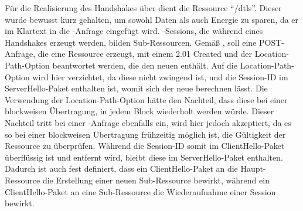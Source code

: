 Für die Realisierung des Handshakes über  dient die Ressource "`/dtls"'. Dieser  wurde bewusst kurz gehalten, um sowohl Daten
als auch Energie zu sparen, da er im Klartext in die -Anfrage eingefügt wird. -Sessions, die während eines Handshakes erzeugt
werden, bilden Sub-Ressourcen. Gemäß  \cite[Abschnitt 5.8.2]{draftcoap13}, soll eine POST-Anfrage, die eine Ressource erzeugt, mit einem
2.01 Created und der Location-Path-Option beantwortet werden, die den neuen  enthält. Auf die Location-Path-Option wird hier verzichtet,
da diese nicht zwingend ist, und die Session-ID im ServerHello-Paket enthalten ist, womit sich der neue  berechnen lässt. Die Verwendung
der Location-Path-Option hätte den Nachteil, dass diese bei einer blockweisen Übertragung, in jedem Block wiederholt werden würde. Dieser Nachteil
tritt bei einer -Anfrage ebenfalls ein, wird hier jedoch akzeptiert, da es so bei einer blockweisen Übertragung frühzeitig möglich ist,
die Gültigkeit der Ressource zu überprüfen. Während die Session-ID somit im ClientHello-Paket überflüssig ist und entfernt wird, bleibt diese im
ServerHello-Paket enthalten. Dadurch ist auch fest definiert, dass ein ClientHello-Paket an die Haupt-Ressource die Erstellung einer neuen
Sub-Ressource bewirkt, während ein ClientHello-Paket an eine Sub-Ressource die Wiederaufnahme einer Session bewirkt.

